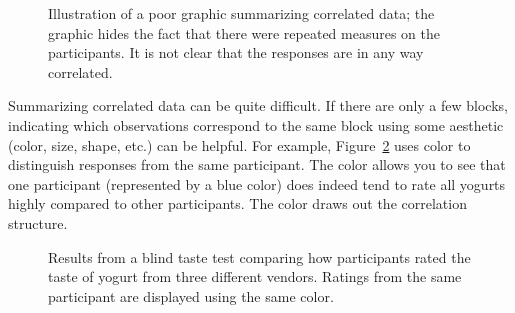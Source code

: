 \documentclass[
  letterpaper,
  DIV=11,
  numbers=noendperiod]{scrreprt}
\theoremstyle{definition}
\theoremstyle{definition}
\theoremstyle{plain}
\theoremstyle{remark}
\begin{document}
\begin{figure}


\caption{\label{fig-blocksummaries-bad-plot}Illustration of a poor
graphic summarizing correlated data; the graphic hides the fact that
there were repeated measures on the participants. It is not clear that
the responses are in any way correlated.}

\end{figure}%

Summarizing correlated data can be quite difficult. If there are only a
few blocks, indicating which observations correspond to the same block
using some aesthetic (color, size, shape, etc.) can be helpful. For
example, Figure~\ref{fig-blocksummaries-color-plot} uses color to
distinguish responses from the same participant. The color allows you to
see that one participant (represented by a blue color) does indeed tend
to rate all yogurts highly compared to other participants. The color
draws out the correlation structure.

\begin{figure}


\caption{\label{fig-blocksummaries-color-plot}Results from a blind taste
test comparing how participants rated the taste of yogurt from three
different vendors. Ratings from the same participant are displayed using
the same color.}

\end{figure}%
\end{document}
